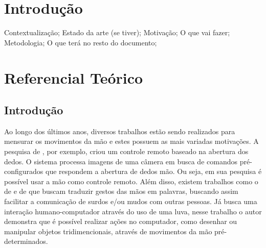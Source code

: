 \documentclass[
	12pt,				%
	openright,			%
	oneside,			%
	a4paper,			%
	english,			%
	brazil				%
	]{abntex2}
\begin{document}
%
%
%	
%	
%	
%	
%	
%
%
%
%
%


\textual

\chapter{Introdução} %
		
		Contextualização; Estado da arte (se tiver); Motivação; O que vai fazer; Metodologia; O que terá no resto do documento;




	
	\chapter{Referencial Teórico}

		\section{Introdução}

		Ao longo dos últimos anos, diversos trabalhos estão sendo realizados para mensurar os movimentos da mão e estes possuem as mais variadas motivações. A pesquisa de \cite{daeholee2009vision}, por exemplo, criou um controle remoto baseado na abertura dos dedos. O sistema processa imagens de uma câmera em busca de comandos pré-configurados que respondem a abertura de dedos mão. Ou seja, em sua pesquisa é possível usar a mão como controle remoto. Além disso, existem trabalhos como o de \cite{solanki2013sign} e de \cite{anbarasi2013deafmute} que buscam traduzir gestos das mãos em palavras, buscando assim facilitar a comunicação de surdos e/ou mudos com outras pessoas. Já \cite{kumar2012hci} busca uma interação humano-computador através do uso de uma luva, nesse trabalho o autor demonstra que é possível realizar ações no computador, como desenhar ou manipular objetos tridimencionais, através de movimentos da mão pré-determinados.
\end{document}
